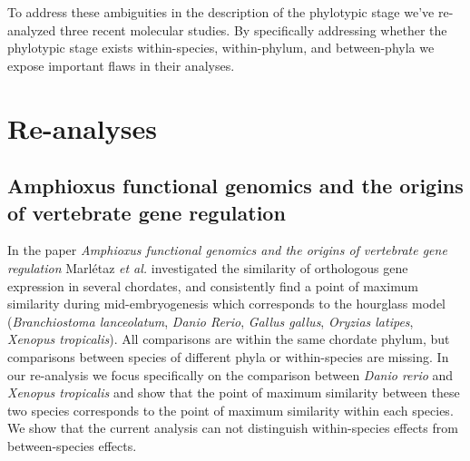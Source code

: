 To address these ambiguities in the description of the phylotypic stage we've re-analyzed three recent molecular studies. By specifically addressing whether the phylotypic stage exists within-species, within-phylum, and between-phyla we expose important flaws in their analyses.

\section{Re-analyses}


\subsection{Amphioxus functional genomics and the origins of vertebrate gene regulation} \label{subsection:marletaz}

In the paper \textit{Amphioxus functional genomics and the origins of vertebrate gene regulation}\cite{marletaz2018} Marl\'etaz \textit{et al.} investigated the similarity of orthologous gene expression in several chordates, and consistently find a point of maximum similarity during mid-embryogenesis which corresponds to the hourglass model (\textit{Branchiostoma lanceolatum}, \textit{Danio Rerio}, \textit{Gallus gallus}, \textit{Oryzias latipes}, \textit{Xenopus tropicalis}). All comparisons are within the same chordate phylum, but comparisons between species of different phyla or within-species are missing. In our re-analysis we focus specifically on the comparison between \textit{Danio rerio} and \textit{Xenopus tropicalis} and show that the point of maximum similarity between these two species corresponds to the point of maximum similarity within each species. We show that the current analysis can not distinguish within-species effects from between-species effects.

